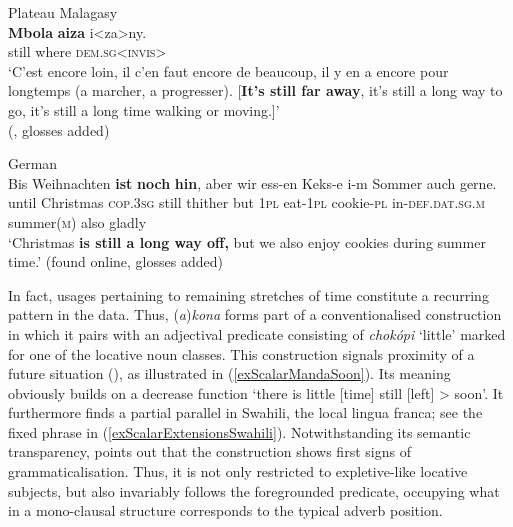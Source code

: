 \begin{exe}
	\ex Plateau Malagasy\label{exScalarDecreaseMalagasy}\\
	\gll \textbf{Mbola} \textbf{aiza} i<za>ny.\\
	still where \textsc{dem}.\textsc{sg}<\textsc{invis}>\\
	\glt \lq{}C'est encore loin, il c'en faut encore de beaucoup, il y en a encore pour longtemps (a marcher, a progresser). [\textbf{It’s still far away}, it’s still a long way to go, it’s still a long time walking or moving.]'
	\\(\cite[398]{Dez1980}, glosses added)

	\ex German\label{exScalarDecreaseNochHin}\\
	\gll Bis Weihnachten \textbf{ist} \textbf{noch} \textbf{hin}, aber wir ess-en Keks-e i-m Sommer auch gerne.\\
	until Christmas \textsc{cop}.3\textsc{sg} still thither but 1\textsc{pl} eat-1\textsc{pl} cookie-\textsc{pl} in-\textsc{def}.\textsc{dat}.\textsc{sg}.\textsc{m} summer(\textsc{m}) also gladly\\
	\glt \lq Christmas \textbf{is still a long way off,} but we also enjoy cookies during summer time.\rq{ }(found online, glosses added)%
\end{exe}

In fact, usages pertaining to remaining stretches of time constitute a recurring pattern in the data. Thus,  (\mbox{\textit{a})\textit{kona}} forms part of a conventionalised construction in which it pairs with an adjectival predicate consisting of  \textit{chokópi} \lq little\rq{ }marked for one of the locative noun classes. This construction signals proximity of a future situation (), as illustrated in (\ref{exScalarMandaSoon}). Its meaning obviously builds on a decrease function \lq there is little [time] still [left] > soon\rq{}. It furthermore finds a partial parallel in Swahili, the local lingua franca; see the fixed phrase in (\ref{exScalarExtensionsSwahili}). Notwithstanding its semantic transparency, \textcite{Bernander2021} points out that the  construction shows first signs of grammaticalisation. Thus, it is not only restricted to expletive-like locative subjects, but also invariably follows the foregrounded predicate, occupying what in a mono-clausal structure corresponds to the typical adverb position. 

